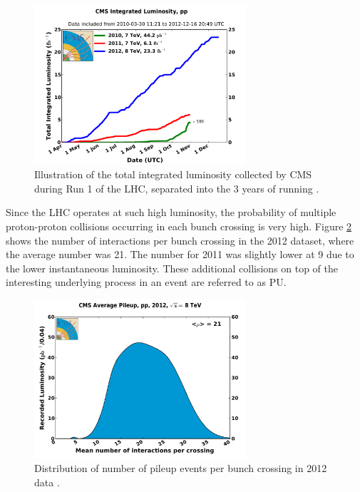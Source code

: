 \begin{figure}[htbp]
   \includegraphics[width=0.7\textwidth]{plots/detector/int_lumi_cumulative_pp_2.pdf}
\caption[Illustration of the total integrated luminosity collected by CMS during
Run 1 of the LHC.]{Illustration of the total integrated luminosity collected by
CMS during Run 1 of the LHC, separated into the 3 years of running \cite{cmslumitwiki}.}
\label{fig:detlumi}
\end{figure}

Since the LHC operates at such high luminosity, the probability of multiple
proton-proton collisions occurring in each bunch crossing is very high. Figure 
\ref{fig:PU} shows the number of interactions per bunch crossing in the
2012 dataset, where the average number was 21. The number for 2011 was slightly
lower at 9 due to the lower instantaneous luminosity. 
These additional collisions on top of the interesting
underlying process in an event are referred to as \ac{PU}.

\begin{figure}[htbp]
   \includegraphics[width=0.7\textwidth]{plots/detector/pileup_pp_2012-2.pdf}
\caption[Distribution of number of pileup events per bunch crossing in 2012
data.]{Distribution of number of pileup events per bunch crossing in 2012 data \cite{cmslumitwiki}.}
\label{fig:PU}
\end{figure}

